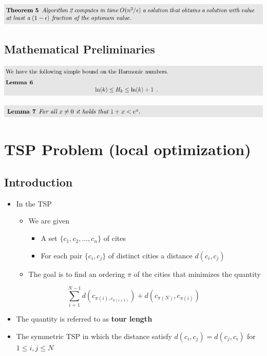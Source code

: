 \documentclass[11pt]{article}
\begin{document}
\begin{center}
\includegraphics[width=.9\linewidth]{Approximation Algorithms/screenshot_2019-04-28_09-25-29.png}
\end{center}

\subsection{Mathematical Preliminaries}
\label{sec:org0b3a055}
\begin{center}
\includegraphics[width=.9\linewidth]{Approximation Algorithms/screenshot_2019-04-28_09-29-11.png}
\end{center}

\begin{center}
\includegraphics[width=.9\linewidth]{Approximation Algorithms/screenshot_2019-04-28_09-29-40.png}
\end{center} 

\section{TSP Problem (local optimization)}
\label{sec:orgcf5e5f9}
\subsection{Introduction}
\label{sec:org1248802}
\begin{itemize}
\item In the TSP
\begin{itemize}
\item We are given
\begin{itemize}
\item A set \(\{c_1, c_2, \dots, c_n\}\) of cites
\item For each pair \(\{c_i, c_j\}\) of distinct cities a distance \(d(c_i,c_j)\)
\end{itemize}
\item The goal is to find an ordering \(\pi\) of the cities that minimizes the quantity
\end{itemize}
\end{itemize}
\begin{equation*}
	\sum_{i=1}^{N-1} d(c_{\pi(i), c_{\pi(i+1)}}) + d(c_{\pi(N)}, c_{\pi(i)})
\end{equation*}
\begin{itemize}
\item The quantity is referred to as \textbf{tour length}
\item The symmetric \(\text{TSP}\) in which the distance satisfy \(d(c_i, c_j) = d(c_j, c_i)\) for \(1 \leq i, j \leq N\)
\end{itemize}
\end{document}
